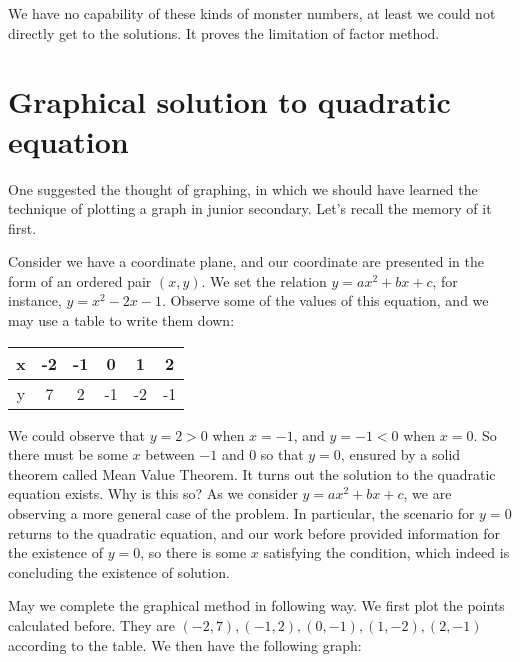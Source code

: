 \documentclass[12pt]{article}
\begin{document}
    We have no capability of these kinds of monster numbers, at least we could not directly get to the solutions. It proves the limitation of factor method.

    \section*{Graphical solution to quadratic equation}
    One suggested the thought of graphing, in which we should have learned the technique of plotting a graph in junior secondary. Let's recall the memory of it first.

    Consider we have a coordinate plane, and our coordinate are presented in the form of an ordered pair $(x,y)$. We set the relation $y=ax^2+bx+c$, for instance, $y=x^2-2x-1$. Observe some of the values of this equation, and we may use a table to write them down:
    \begin{center}
        \begin{tabular}{|c||c|c|c|c|c|}
            \hline
            x&-2&-1&0&1&2\\
            \hline
            y&7&2&-1&-2&-1\\
            \hline
        \end{tabular}
    \end{center}

    We could observe that $y=2>0$ when $x=-1$, and $y=-1<0$ when $x=0$. So there must be some $x$ between $-1$ and $0$ so that $y=0$, ensured by a solid theorem called Mean Value Theorem. It turns out the solution to the quadratic equation exists. Why is this so? As we consider $y=ax^2+bx+c$, we are observing a more general case of the problem. In particular, the scenario for $y=0$ returns to the quadratic equation, and our work before provided information for the existence of $y=0$, so there is some $x$ satisfying the condition, which indeed is concluding the existence of solution.

    May we complete the graphical method in following way. We first plot the points calculated before. They are $(-2,7),(-1,2),(0,-1),(1,-2),(2,-1)$ according to the table. We then have the following graph:\\
    \begin{center}
    \end{center}
\end{document}
